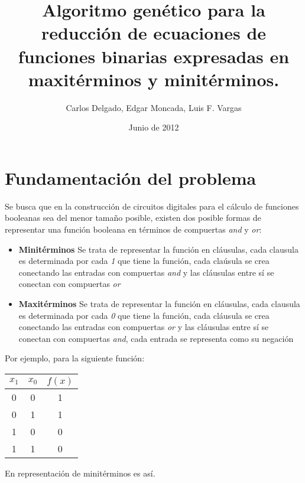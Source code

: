 \documentclass[letter]{article}
\title{Algoritmo genético para la reducción de ecuaciones de funciones binarias expresadas en maxitérminos y minitérminos.}
\author{Carlos Delgado, Edgar Moncada, Luis F. Vargas}
\date{Junio de 2012}
\begin{document}
\maketitle{}
\renewcommand{\tablename}{\textbf{Tabla}}


\section{Fundamentación del problema}

Se busca que en la construcción de circuitos digitales para el cálculo de funciones booleanas sea del menor tamaño posible, existen dos posible formas de representar una función booleana en términos de compuertas \textit{and} y \textit{or}:

\begin{itemize}
	\item \textbf{Minitérminos} Se trata de representar la función en cláusulas, cada clausula es determinada por cada \textit{1} que tiene la función, cada claúsula se crea conectando las entradas con compuertas \textit{and} y las cláusulas entre sí se conectan con compuertas \textit{or}
	\item \textbf{Maxitérminos} Se trata de representar la función en cláusulas, cada clausula es determinada por cada \textit{0} que tiene la función, cada cláusula se crea conectando las entradas con compuertas \textit{or} y las cláusulas entre sí se conectan con compuertas \textit{and}, cada entrada se representa como su negación
\end{itemize}

Por ejemplo, para la siguiente función:

\begin{table}[H]
	\centering
	\begin{tabular}{|c | c | c|}
		\hline
		$x_1$ & $x_0$ & $f(x)$ \\
		\hline
		\hline
		0 & 0& 1\\
		\hline
		0 & 1 & 1\\
		\hline
		1 & 0& 0\\
		\hline
		1 & 1 & 0\\
		\hline
	\end{tabular}
\end{table}

En representación de minitérminos es así.
\end{document}
